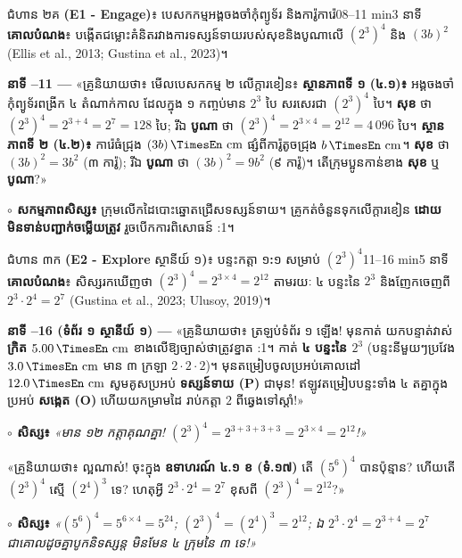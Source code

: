 \documentclass[a4paper,12pt]{article}
\newcommand{\en}[1]{{\TimesEn #1}}
\newcommand{\enbf}[1]{{\TimesEn\textbf{#1}}}
\newcommand{\unit}[1]{\,\text{\en{#1}}}
\newcommand{\teachersays}[1]{{\muol\fontsize{10.8pt}{17pt}\selectfont «គ្រូនិយាយថា៖} #1»}
\begin{document}
\Needspace{2.0cm}
\begin{phasebox}{ជំហាន ២គ \enbf{(E1 - Engage)}៖ បេសកកម្មអង្គចងចាំកុំព្យូទ័រ និងការ៉ូការ៉េ}{08--11 min}{3 នាទី}
\textbf{គោលបំណង}៖ បង្កើតជម្លោះគំនិតរវាងការទស្សន៍ទាយរបស់សុខនិងបូណាលើ $(2^3)^4$ និង $(3b)^2$ \en{(Ellis et al., 2013; Gustina et al., 2023)}។
\end{phasebox}
\begin{scriptbox}
  \textbf{នាទី \en{08--11} — }\teachersays{មើលបេសកកម្ម ២ លើក្ដារខៀន៖ \textbf{ស្ថានភាពទី ១ (៤.១)៖} អង្គចងចាំកុំព្យូទ័រពង្រីក ៤ តំណាក់កាល ដែលក្នុង ១ កញ្ចប់មាន $2^3$ បៃ សរសេរជា $(2^3)^4$ បៃ។ \textbf{សុខ} ថា $(2^3)^4 = 2^{3+4} = 2^7 = 128$ បៃ; រីឯ \textbf{បូណា} ថា $(2^3)^4 = 2^{3\times 4} = 2^{12} = 4\,096$ បៃ។ \textbf{ស្ថានភាពទី ២ (៤.២)៖} ការ៉េធំជ្រុង $(3b)\unit{cm}$ ផ្សំពីការ៉ូតូចជ្រុង $b\unit{cm}$។ \textbf{សុខ} ថា $(3b)^2 = 3b^2$ (៣ ការ៉ូ); រីឯ \textbf{បូណា} ថា $(3b)^2 = 9b^2$ (៩ ការ៉ូ)។ តើក្រុមប្អូនកាន់ខាង \textbf{សុខ} ឬ \textbf{បូណា}?}\par\vspace{2pt}
  \textbf{$\circ$ សកម្មភាពសិស្ស៖} ក្រុមលើកដៃបោះឆ្នោតជ្រើសទស្សន៍ទាយ។ គ្រូកត់ចំនួនទុកលើក្ដារខៀន \textbf{ដោយមិនទាន់បញ្ជាក់ចម្លើយត្រូវ} រួចបើកការពិសោធន៍ \en{1:1}។
\end{scriptbox}

\Needspace{2.0cm}
\begin{phasebox}{ជំហាន ៣ក \enbf{(E2 - Explore} ស្ថានីយ៍ ១\enbf{)}៖ បន្ទះកត្តា ១\enbf{:}១ សម្រាប់ $(2^3)^4$}{11--16 min}{5 នាទី}
\textbf{គោលបំណង}៖ សិស្សរកឃើញថា $(2^3)^4 = 2^{3\times 4} = 2^{12}$ តាមរយៈ ៤ បន្ទះនៃ $2^3$ និងញែកចេញពី $2^3\cdot 2^4 = 2^7$ \en{(Gustina et al., 2023; Ulusoy, 2019)}។
\end{phasebox}
\begin{scriptbox}
  \textbf{នាទី \en{11--16} (ទំព័រ ១ ស្ថានីយ៍ ១) — }\teachersays{ត្រឡប់ទំព័រ ១ ឡើង! មុនកាត់ យកបន្ទាត់វាស់ \textbf{ក្រិត $5.00\unit{cm}$} ខាងលើឱ្យច្បាស់ថាត្រូវខ្នាត \en{1:1}។ កាត់ \textbf{៤ បន្ទះនៃ $2^3$} (បន្ទះនីមួយៗប្រវែង $3.0\unit{cm}$ មាន ៣ ក្រឡា $2\cdot 2\cdot 2$)។ មុនតម្រៀបចូលប្រអប់គោលដៅ $12.0\unit{cm}$ សូមគូសប្រអប់ \textbf{ទស្សន៍ទាយ (\en{P})} ជាមុន! ឥឡូវតម្រៀបបន្ទះទាំង ៤ តគ្នាក្នុងប្រអប់ \textbf{សង្កេត (\en{O})} ហើយយកម្រាមដៃ \textbf{\en{[tracing]}} រាប់កត្តា $2$ ពីឆ្វេងទៅស្ដាំ!}\par\vspace{2pt}
  \textbf{$\circ$ សិស្ស៖} \textit{«មាន ១២ កត្តាគុណគ្នា! $(2^3)^4 = 2^{3+3+3+3} = 2^{3\times 4} = 2^{12}$!»}\par\vspace{3pt}
  \teachersays{ល្អណាស់! ចុះក្នុង \textbf{ឧទាហរណ៍ ៤.១ ខ (ទំ.១៧)} តើ $(5^6)^4$ បានប៉ុន្មាន? ហើយតើ $(2^3)^4$ ស្មើ $(2^4)^3$ ទេ? ហេតុអ្វី $2^3\cdot 2^4 = 2^7$ ខុសពី $(2^3)^4 = 2^{12}$?}\par\vspace{2pt}
  \textbf{$\circ$ សិស្ស៖} \textit{«$(5^6)^4 = 5^{6\times 4} = 5^{24}$; $(2^3)^4 = (2^4)^3 = 2^{12}$; ឯ $2^3\cdot 2^4 = 2^{3+4} = 2^7$ ជាគោលដូចគ្នាបូកនិទស្សន្ត មិនមែន ៤ ក្រុមនៃ ៣ ទេ!»}
\end{scriptbox}
\end{document}
